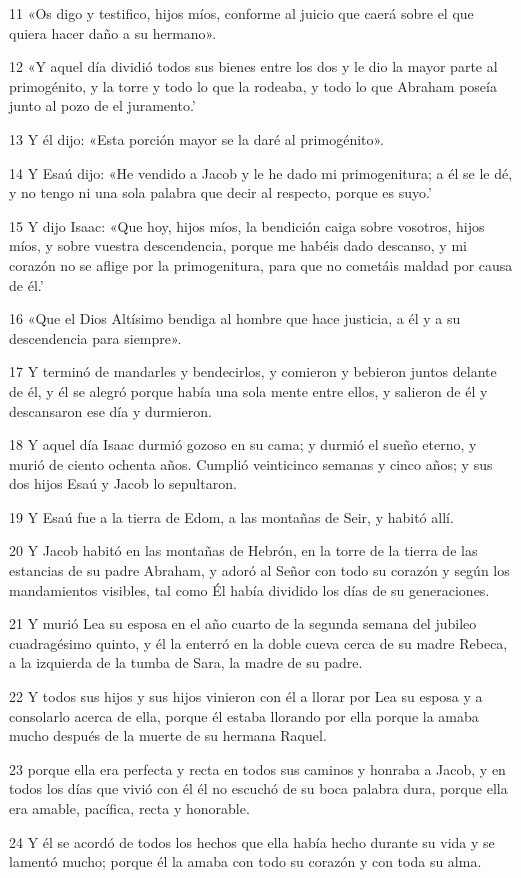\par 11 «Os digo y testifico, hijos míos, conforme al juicio que caerá sobre el que quiera hacer daño a su hermano».
\par 12 «Y aquel día dividió todos sus bienes entre los dos y le dio la mayor parte al primogénito, y la torre y todo lo que la rodeaba, y todo lo que Abraham poseía junto al pozo de el juramento.'
\par 13 Y él dijo: «Esta porción mayor se la daré al primogénito».
\par 14 Y Esaú dijo: «He vendido a Jacob y le he dado mi primogenitura; a él se le dé, y no tengo ni una sola palabra que decir al respecto, porque es suyo.'
\par 15 Y dijo Isaac: «Que hoy, hijos míos, la bendición caiga sobre vosotros, hijos míos, y sobre vuestra descendencia, porque me habéis dado descanso, y mi corazón no se aflige por la primogenitura, para que no cometáis maldad por causa de él.'
\par 16 «Que el Dios Altísimo bendiga al hombre que hace justicia, a él y a su descendencia para siempre».
\par 17 Y terminó de mandarles y bendecirlos, y comieron y bebieron juntos delante de él, y él se alegró porque había una sola mente entre ellos, y salieron de él y descansaron ese día y durmieron.
\par 18 Y aquel día Isaac durmió gozoso en su cama; y durmió el sueño eterno, y murió de ciento ochenta años. Cumplió veinticinco semanas y cinco años; y sus dos hijos Esaú y Jacob lo sepultaron.
\par 19 Y Esaú fue a la tierra de Edom, a las montañas de Seir, y habitó allí.
\par 20 Y Jacob habitó en las montañas de Hebrón, en la torre de la tierra de las estancias de su padre Abraham, y adoró al Señor con todo su corazón y según los mandamientos visibles, tal como Él había dividido los días de su generaciones.
\par 21 Y murió Lea su esposa en el año cuarto de la segunda semana del jubileo cuadragésimo quinto, y él la enterró en la doble cueva cerca de su madre Rebeca, a la izquierda de la tumba de Sara, la madre de su padre. 
\par 22 Y todos sus hijos y sus hijos vinieron con él a llorar por Lea su esposa y a consolarlo acerca de ella, porque él estaba llorando por ella porque la amaba mucho después de la muerte de su hermana Raquel.
\par 23 porque ella era perfecta y recta en todos sus caminos y honraba a Jacob, y en todos los días que vivió con él él no escuchó de su boca palabra dura, porque ella era amable, pacífica, recta y honorable.
\par 24 Y él se acordó de todos los hechos que ella había hecho durante su vida y se lamentó mucho; porque él la amaba con todo su corazón y con toda su alma.

